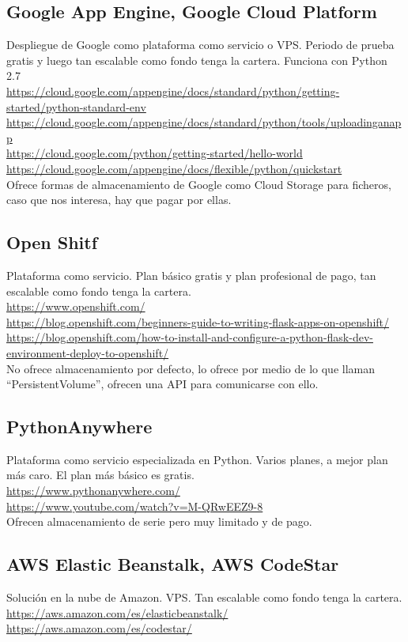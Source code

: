 \subsection{Google App Engine, Google Cloud Platform}
Despliegue de Google como plataforma como servicio o VPS. Periodo de prueba
gratis y luego tan escalable como fondo tenga la cartera. Funciona con Python
2.7\\
\url{https://cloud.google.com/appengine/docs/standard/python/getting-started/python-standard-env}\\
\url{https://cloud.google.com/appengine/docs/standard/python/tools/uploadinganapp}\\
\url{https://cloud.google.com/python/getting-started/hello-world}\\
\url{https://cloud.google.com/appengine/docs/flexible/python/quickstart}\\

Ofrece formas de almacenamiento de Google como Cloud Storage para ficheros, caso
que nos interesa, hay que pagar por ellas.
\subsection{Open Shitf}
Plataforma como servicio. Plan básico gratis y plan profesional de pago, tan
escalable como fondo tenga la cartera.\\
\url{https://www.openshift.com/}\\
\url{https://blog.openshift.com/beginners-guide-to-writing-flask-apps-on-openshift/}\\
\url{https://blog.openshift.com/how-to-install-and-configure-a-python-flask-dev-environment-deploy-to-openshift/}\\

No ofrece almacenamiento por defecto, lo ofrece por medio de lo que llaman
``PersistentVolume'', ofrecen una API para comunicarse con ello.
\subsection{PythonAnywhere} 
Plataforma como servicio especializada en Python. Varios planes, a mejor plan
más caro. El plan más básico es gratis.\\
\url{https://www.pythonanywhere.com/}\\
\url{https://www.youtube.com/watch?v=M-QRwEEZ9-8}\\
Ofrecen almacenamiento de serie pero muy limitado y de pago.
\subsection{AWS Elastic Beanstalk,  AWS CodeStar}
Solución en la nube de Amazon. VPS. Tan escalable como fondo tenga la cartera.\\
\url{https://aws.amazon.com/es/elasticbeanstalk/}\\
\url{https://aws.amazon.com/es/codestar/}\\

